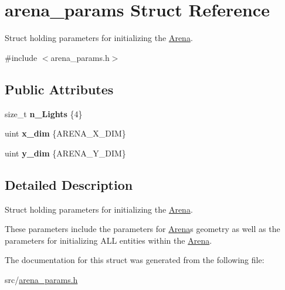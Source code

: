 \hypertarget{structarena__params}{}\section{arena\+\_\+params Struct Reference}
\label{structarena__params}


Struct holding parameters for initializing the \mbox{\hyperlink{class_arena}{Arena}}.  




{\ttfamily \#include $<$arena\+\_\+params.\+h$>$}

\subsection*{Public Attributes}
\begin{DoxyCompactItemize}
\item 
\mbox{\label{structarena__params_a1e0a1b33b5f61550df263333c565a499}} 
size\+\_\+t {\bfseries n\+\_\+\+Lights} \{4\}
\item 
\mbox{\label{structarena__params_afa86b434ed8ea5a4fe9ae14ae1438e8f}} 
uint {\bfseries x\+\_\+dim} \{A\+R\+E\+N\+A\+\_\+\+X\+\_\+\+D\+IM\}
\item 
\mbox{\label{structarena__params_ab5d50b9affa9c753c15e1d6f088824af}} 
uint {\bfseries y\+\_\+dim} \{A\+R\+E\+N\+A\+\_\+\+Y\+\_\+\+D\+IM\}
\end{DoxyCompactItemize}


\subsection{Detailed Description}
Struct holding parameters for initializing the \mbox{\hyperlink{class_arena}{Arena}}. 

These parameters include the parameters for \mbox{\hyperlink{class_arena}{Arena}}\textquotesingle{}s geometry as well as the parameters for initializing A\+LL entities within the \mbox{\hyperlink{class_arena}{Arena}}. 

The documentation for this struct was generated from the following file\+:\begin{DoxyCompactItemize}
\item 
src/\mbox{\hyperlink{arena__params_8h}{arena\+\_\+params.\+h}}\end{DoxyCompactItemize}

